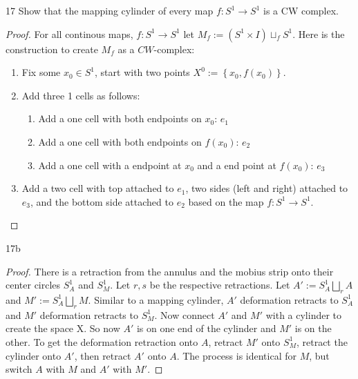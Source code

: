 \documentclass{article}
\begin{document}
\begin{claim}{17}\label{Claim 17.}
    Show that the mapping cylinder of every map $f: S^1 \to S^1$ is a CW complex.
\end{claim}
\begin{proof}
    For all continous maps, $f: S^1 \to S^1$ let $M_f := (S^1 \times I) \sqcup_f S^1$. Here is the construction to create $M_f$ as a $CW$-complex: 
    
    \begin{enumerate}
        \item Fix some $x_0 \in S^1$, start with two points $X^0 := \left\{ x_0, f(x_0) \right\}$. 
        \item Add three 1 cells as follows:
        \begin{enumerate}
            \item Add a one cell with both endpoints on $x_0$: $e_1$ 
            \item Add a one cell with both endpoints on $f(x_0)$: $e_2$ 
            \item Add a one cell with a endpoint at $x_0$ and a end point at $f(x_0)$: $e_3$      
        \end{enumerate}
        
        \item Add a two cell with top attached to $e_1$, two sides (left and right) attached to $e_3$, and the bottom side attached to $e_2$ based on the map $f: S^1 \to S^1$.   
    \end{enumerate}
    
\end{proof}
\begin{claim}{17b}\label{Claim 17b.}
\end{claim}
\begin{proof}
    There is a retraction from the annulus and the mobius strip onto their center circles $S^1_A$ and $S^1_M$. Let $r, s$ be the respective retractions. Let $A' :=   S^1_A \bigsqcup_{r} A$ and $M' := S^1_A \bigsqcup_{r} M$. Similar to a mapping cylinder, $A'$ deformation retracts to $S^1_A$ and $M'$ deformation retracts to $S^1_M$. Now connect $A'$ and $M'$ with a cylinder to create the space X. So now $A'$ is on one end of the cylinder and $M'$ is on the other. To get the deformation retraction onto $A$, retract $M'$ onto $S^1_M$, retract the cylinder onto $A'$, then retract $A'$ onto $A$. The process is identical for $M$, but switch $A$ with $M$ and $A'$ with $M'$.            
\end{proof}
\end{document}
